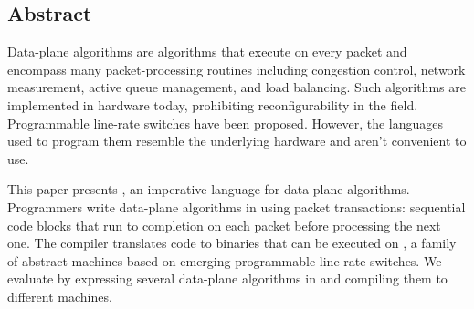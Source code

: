 \subsection*{Abstract}
Data-plane algorithms are algorithms that execute on every packet and encompass
many packet-processing routines including congestion control, network
measurement, active queue management, and load balancing. Such algorithms are
implemented in hardware today, prohibiting reconfigurability in the field.
Programmable line-rate switches have been proposed. However, the languages used
to program them resemble the underlying hardware and aren't convenient to use.

This paper presents \pktlanguage, an imperative language for data-plane
algorithms. Programmers write data-plane algorithms in \pktlanguage using
packet transactions: sequential code blocks that run to completion on each
packet before processing the next one. The \pktlanguage compiler translates
\pktlanguage code to binaries that can be executed on \absmachine, a family of
abstract machines based on emerging programmable line-rate switches.  We
evaluate \pktlanguage by expressing several data-plane algorithms in
\pktlanguage and compiling them to different \absmachine machines.
